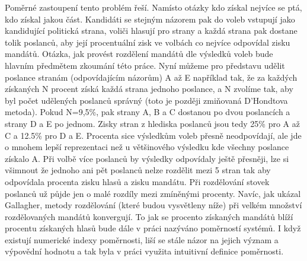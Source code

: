 \documentclass[12pt]{report}
\begin{document}
Poměrné zastoupení tento problém řeší.
Namísto otázky kdo získal nejvíce se ptá, kdo získal jakou část.
Kandidáti se stejným názorem pak do voleb vstupují jako kandidující politická strana, voliči hlasují pro strany a každá strana pak dostane tolik poslanců, aby její procentuální zisk ve volbách co nejvíce odpovídal zisku mandátů.
Otázka, jak provést rozdělení mandátů dle výsledků voleb bude hlavním předmětem zkoumání této práce.
Nyní můžeme pro představu udělit poslance stranám (odpovídajícím názorům) A až E například tak, že za každých získaných N procent získá každá strana jednoho poslance, a N zvolíme tak, aby byl počet udělených poslanců správný (toto je později zmiňovaná D'Hondtova metoda).
Pokud N=9,5\%, pak strany A, B a C dostanou po dvou poslancích a strany D a E po jednom.
Zisky stran z hlediska poslanců jsou tedy 25\% pro A až C a 12.5\% pro D a E.
Procenta sice výsledkům voleb přesně neodpovídají, ale jde o mnohem lepší reprezentaci než u většinového výsledku kde všechny poslance získalo A.
Při volbě více poslanců by výsledky odpovídaly ještě přesněji, lze si všimnout že jednoho ani pět poslanců nelze  rozdělit mezi 5 stran tak aby odpovídala procenta zisku hlasů a zisku mandátu.
Při rozdělování stovek poslanců už půjde jen o malé rozdíly mezi zmíněnými procenty.
Navíc, jak ukázal Gallagher, metody rozdělování (které budou vysvětleny níže) při velkém množství rozdělovaných mandátů konvergují.\autocite{GAL1} To jak se procento získaných mandátů blíží procentu získaných hlasů bude dále v práci nazýváno poměrností systémů.
I když existují numerické indexy poměrnosti, liší se stále názor na jejich význam a výpovědní hodnotu a tak byla v práci využita intuitivní definice poměrnosti.\autocite{GAL2}
\end{document}
